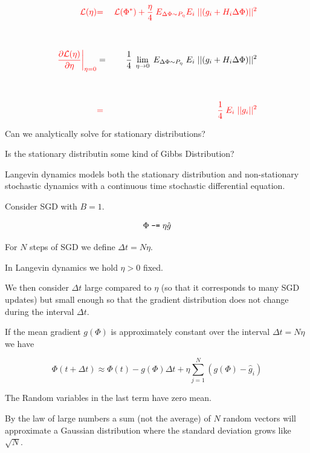 {

\begin{eqnarray*}
{\color{red} {\cal L}(\eta)}  & {\color{red} =} & {\color{red} {\cal L}(\Phi^*) + \frac{\eta}{4}\;E_{\Delta \Phi \sim P_\eta}E_i \;||(g_i + H_i\Delta \Phi)||^2} \\
\\
\\
{\color{red} \left.\frac{\partial {\cal L}(\eta)}{\partial \eta}\right|_{\eta = 0}} & = & \frac{1}{4} \; \lim_{\eta \rightarrow 0} \; E_{\Delta \Phi \sim P_\eta}\; E_i \;||(g_i + H_i\Delta \Phi)||^2 \\
\\
\\
& {\color{red} =} & {\color{red} \frac{1}{4}\; E_i\;||g_i||^2}
\end{eqnarray*}



Can we analytically solve for stationary distributions?

\vfill
Is the stationary distributin some kind of Gibbs Distribution?

\vfill
Langevin dynamics models both the stationary distribution and non-stationary stochastic dynamics
with {\color{red} a continuous time stochastic differential equation}.



\vfill
Consider SGD with $B = 1$.

$$\Phi \;\mbox{\tt -=}\; \eta\hat{g}$$

\vfill
For $N$ steps of SGD we define $\Delta t = N \eta$.

\vfill
In Langevin dynamics we hold $\eta > 0$ fixed.

\vfill
We then consider $\Delta t$ large compared to $\eta$ (so that it corresponds to many SGD updates) but
small enough so that the gradient distribution does not change during the interval $\Delta t$.


If the mean gradient $g(\Phi)$ is approximately constant over the interval $\Delta t = N \eta$ we have

$$\Phi(t + \Delta t)  \approx \Phi(t) -g(\Phi)\Delta t + \eta \sum_{j=1}^N (g(\Phi) - \hat{g}_i)$$

\vfill
The Random variables in the last term have zero mean.

\vfill
By the law of large numbers a sum (not the average) of $N$ random vectors will approximate a Gaussian distribution where the standard deviation
grows like $\sqrt{N}$.

}
